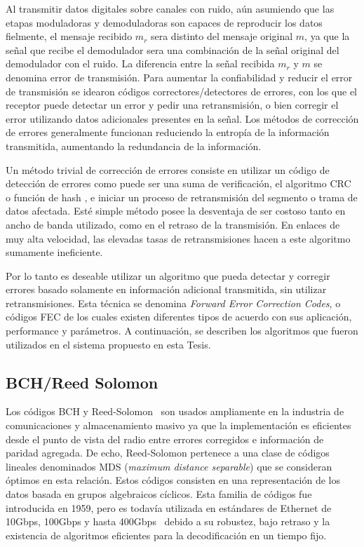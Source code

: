 Al transmitir datos digitales sobre canales con ruido, aún asumiendo que las etapas moduladoras y demoduladoras son capaces de reproducir los datos fielmente, el mensaje recibido $m_r$ sera distinto del mensaje original $m$, ya que la señal que recibe el demodulador sera una combinación de la señal original del demodulador con el ruido. La diferencia entre la señal recibida $m_r$ y $m$ se denomina error de transmisión. Para aumentar la confiabilidad y reducir el error de transmisión se idearon códigos correctores/detectores de errores, con los que el receptor puede detectar un error y pedir una retransmisión, o bien corregir el error utilizando datos adicionales presentes en la señal. Los métodos de corrección de errores generalmente funcionan reduciendo la entropía de la información transmitida, aumentando la redundancia de la información.

Un método trivial de corrección de errores consiste en utilizar un código de detección de errores como puede ser una suma de verificación, el algoritmo CRC o función de hash \cite{Menezes:1996:HAC:548089}, e iniciar un proceso de retransmisión del segmento o trama de datos afectada. Esté simple método posee la desventaja de ser costoso tanto en ancho de banda utilizado, como en el retraso de la transmisión. En enlaces de muy alta velocidad, las elevadas tasas de retransmisiones hacen a este algoritmo sumamente ineficiente.

Por lo tanto es deseable utilizar un algoritmo que pueda detectar y corregir errores basado solamente en información adicional transmitida, sin utilizar retransmisiones. Esta técnica se denomina \textsl{Forward Error Correction Codes}, o códigos FEC \cite{Moon:05} de los cuales existen diferentes tipos de acuerdo con sus aplicación, performance y parámetros. A continuación, se describen los algoritmos que fueron utilizados en el sistema propuesto en esta Tesis.

\subsection{BCH/Reed Solomon}
Los códigos BCH y Reed-Solomon~\cite{reed1960polynomial} son usados ampliamente en la industria de comunicaciones y almacenamiento masivo ya que la implementación es eficientes desde el punto de vista del radio entre errores corregidos e información de paridad agregada. De echo, Reed-Solomon pertenece a una clase de códigos lineales denominados MDS (\textit{maximum distance separable}) que se consideran óptimos en esta relación. Estos códigos consisten en una representación de los datos basada en grupos algebraicos cíclicos. 
Esta familia de códigos fue introducida en 1959, pero es todavía utilizada en estándares de Ethernet de 10Gbps, 100Gbps y hasta 400Gbps~\cite{liforward} debido a su robustez, bajo retraso y la existencia de algoritmos eficientes para la decodificación en un tiempo fijo.

